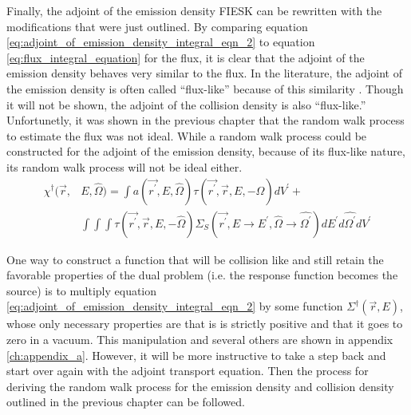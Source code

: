 Finally, the adjoint of the emission density FIESK can be rewritten with the 
modifications that were just outlined. By comparing equation
\ref{eq:adjoint_of_emission_density_integral_eqn_2} to equation 
\ref{eq:flux_integral_equation} for the flux, it is clear that
the adjoint of the emission density behaves very similar to the flux. In the 
literature, the adjoint of the emission density is often called ``flux-like'' 
because of this similarity \citep{hoogenboom}. Though it will not be shown, 
the adjoint of the collision density is also ``flux-like.'' Unfortunetly, it 
was shown in the previous chapter that the random walk process to estimate the 
flux was not ideal. While a random walk process could be constructed for the 
adjoint of the emission density, because of its flux-like nature, its random 
walk process will not be ideal either. 
\begin{equation}
  \begin{split}
    \chi^{\dagger}(\vec{r},&E,\hat{\Omega}) =  \int a(\vec{r^{'}},E,\hat{\Omega}) 
    \tau(\vec{r^{'}},\vec{r},E,-\hat{\Omega}) dV^{'} + \\
    & \int\int\int  \tau(\vec{r^{'}},\vec{r},E,-\hat{\Omega}) 
    \Sigma_S(\vec{r^{'}},E \to E^{'},\hat{\Omega} \to \hat{\Omega^{'}})
    dE^{'}d\hat{\Omega^{'}}dV^{'}
  \end{split}
  \label{eq:adjoint_of_emission_density_integral_eqn_2}
\end{equation}

One way to construct a function that will be collision like and still retain
the favorable properties of the dual problem (i.e. the response function 
becomes the source) is to multiply equation 
\ref{eq:adjoint_of_emission_density_integral_eqn_2} by some function 
$\Sigma^{\dagger}(\vec{r},E)$, whose only necessary properties are that is is
strictly positive and that it goes to zero in a vacuum. This manipulation and 
several others are shown in appendix \ref{ch:appendix_a}. However, it will be 
more instructive to take a step back and start over again with the adjoint 
transport equation. Then the process for deriving the random walk process for 
the emission density and collision density outlined in the previous chapter 
can be followed. 
